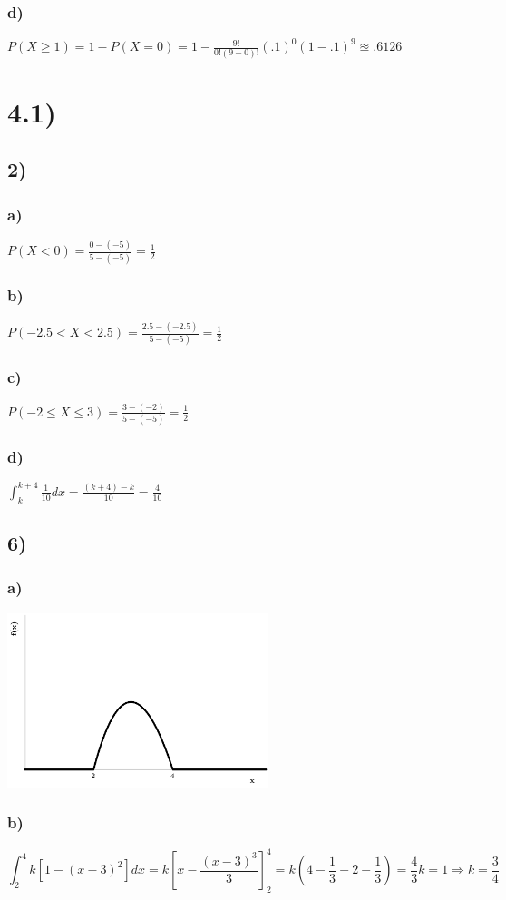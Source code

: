 \documentclass{article}
\begin{document}
		\subsubsection*{d)}
			$ P(X \geq 1) = 1-P(X=0) = 1-\frac{9!}{0!(9-0)!}(.1)^0(1-.1)^9 \approxeq .6126  $
\section*{4.1)}
	\subsection*{2)}
		\subsubsection*{a)}
			$P(X<0) = \frac{0-(-5)}{5-(-5)} = \frac{1}{2} $
		\subsubsection*{b)}
			$P(-2.5 < X < 2.5) = \frac{2.5-(-2.5)}{5-(-5)} = \frac{1}{2}$
		\subsubsection*{c)}
			$P(-2 \leq X \leq 3) = \frac{3-(-2)}{5-(-5)} = \frac{1}{2}$
		\subsubsection*{d)}
			$\int_k^{k+4}\frac{1}{10}dx = \frac{(k+4)-k}{10} = \frac{4}{10} $
	\subsection{6)}
		\subsubsection*{a)}
			\includegraphics[height=2in]{4-1--6a.pdf}
		\subsubsection*{b)}
			$$\int_2^4 k[1-(x-3)^2]dx = k \left [ x-\frac{(x-3)^3}{3} \right ]_2^4 = k \left ( 4-\frac{1}{3} -2-\frac{1}{3} \right ) = \frac{4}{3}k=1 \Rightarrow k = \frac{3}{4} $$
\end{document}
